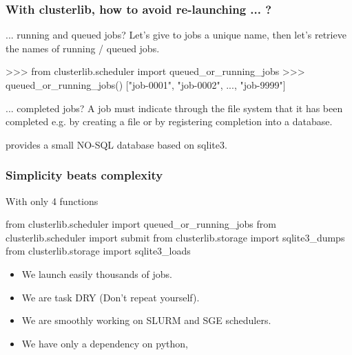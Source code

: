 \documentclass[11pt,compress,serif]{beamer}
\begin{document}
\begin{frame}[fragile=singleslide]
\frametitle{With clusterlib, how to avoid re-launching ... ?}

\begin{block}{... running and queued jobs?}
Let's give to jobs a unique name, then let's retrieve
the names of running / queued jobs. 

\begin{pythoncode}
>>> from clusterlib.scheduler import queued_or_running_jobs
>>> queued_or_running_jobs()
["job-0001", "job-0002", ..., "job-9999"]
\end{pythoncode}

\end{block}


\begin{block}{... completed jobs?}
A job must indicate through the file system that it has been completed {\footnotesize e.g. by
creating a file or by registering completion into a database.}

 provides a small NO-SQL database based on sqlite3.
\end{block}

\end{frame}



\begin{frame}[fragile=singleslide]
\frametitle{Simplicity beats complexity}


With only 4 functions

\begin{pythoncode}
from clusterlib.scheduler import queued_or_running_jobs
from clusterlib.scheduler import submit 
from clusterlib.storage import sqlite3_dumps
from clusterlib.storage import sqlite3_loads
\end{pythoncode}

\begin{itemize}
    \item We launch easily thousands of jobs.
    \item We are task DRY (Don't repeat yourself).
    \item We are smoothly working on SLURM and SGE schedulers.
    \item We have only a dependency on python, 
\end{itemize}    

\end{frame}

\end{document}
